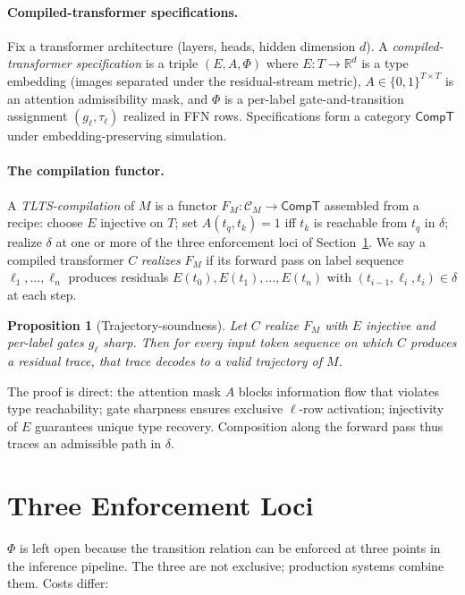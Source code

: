 \documentclass[preprint]{nesy2026}
\newtheorem{prop}{Proposition}
\begin{document}
\paragraph{Compiled-transformer specifications.} Fix a transformer
architecture (layers, heads, hidden dimension $d$). A
\emph{compiled-transformer specification} is a triple
$(E, A, \Phi)$ where $E: T \to \mathbb{R}^d$ is a type embedding
(images separated under the residual-stream metric), $A \in
\{0,1\}^{T \times T}$ is an attention admissibility mask, and $\Phi$
is a per-label gate-and-transition assignment $(g_\ell, \tau_\ell)$
realized in FFN rows. Specifications form a
category $\mathsf{CompT}$ under embedding-preserving simulation.

\paragraph{The compilation functor.} A \emph{TLTS-compilation} of
$M$ is a functor $F_M: \mathcal{C}_M \to \mathsf{CompT}$ assembled
from a recipe: choose $E$ injective on $T$; set $A(t_q, t_k) = 1$
iff $t_k$ is reachable from $t_q$ in $\delta$; realize $\delta$ at
one or more of the three enforcement loci of
Section~\ref{sec:loci}. We say a compiled transformer $C$
\emph{realizes} $F_M$ if its forward pass on label sequence
$\ell_1, \ldots, \ell_n$ produces residuals $E(t_0), E(t_1), \ldots,
E(t_n)$ with $(t_{i-1}, \ell_i, t_i) \in \delta$ at each step.

\begin{prop}[Trajectory-soundness]\label{prop:sound}
Let $C$ realize $F_M$ with $E$ injective and per-label gates $g_\ell$
sharp. Then for every input token sequence on which $C$ produces a
residual trace, that trace decodes to a valid trajectory of $M$.
\end{prop}

The proof is direct: the attention mask $A$ blocks information flow
that violates type reachability; gate sharpness ensures exclusive
$\ell$-row activation; injectivity of $E$ guarantees unique type
recovery. Composition along the forward pass thus traces an
admissible path in $\delta$.

\section{Three Enforcement Loci}
\label{sec:loci}

$\Phi$ is left open because the transition relation can be enforced
at three points in the inference pipeline. The three are not
exclusive; production systems combine them. Costs differ:
\end{document}
